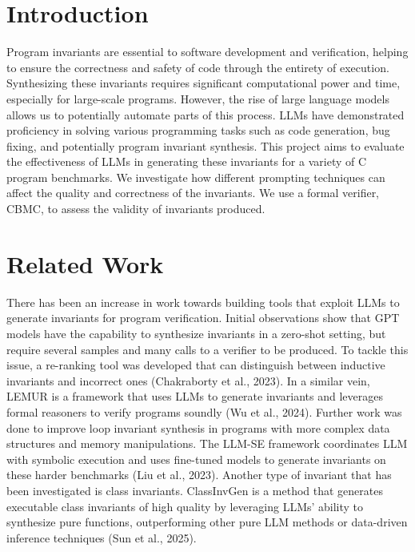 \documentclass[conference]{IEEEtran}
\begin{document}
\section{Introduction}
Program invariants are essential to software development and verification, helping to ensure the correctness and safety of code through the entirety of execution. Synthesizing these invariants requires significant computational power and time, especially for large-scale programs. However, the rise of large language models allows us to potentially automate parts of this process. LLMs have demonstrated proficiency in solving various programming tasks such as code generation, bug fixing, and potentially program invariant synthesis. This project aims to evaluate the effectiveness of LLMs in generating these invariants for a variety of C program benchmarks. We investigate how different prompting techniques can affect the quality and correctness of the invariants. We use a formal verifier, CBMC, to assess the validity of invariants produced. 

\section{Related Work}


There has been an increase in work towards building tools that exploit LLMs to generate invariants for program verification. Initial observations show that GPT models have the capability to synthesize invariants in a zero-shot setting, but require several samples and many calls to a verifier to be produced. To tackle this issue, a re-ranking tool was developed that can distinguish between inductive invariants and incorrect ones (Chakraborty et al., 2023). In a similar vein, LEMUR is a framework that uses LLMs to generate invariants and leverages formal reasoners to verify programs soundly (Wu et al., 2024). Further work was done to improve loop invariant synthesis in programs with more complex data structures and memory manipulations. The LLM-SE framework coordinates LLM with symbolic execution and uses fine-tuned models to generate invariants on these harder benchmarks (Liu et al., 2023). Another type of invariant that has been investigated is class invariants. ClassInvGen is a method that generates executable class invariants of high quality by leveraging LLMs’ ability to synthesize pure functions, outperforming other pure LLM methods or data-driven inference techniques (Sun et al., 2025).
\end{document}
